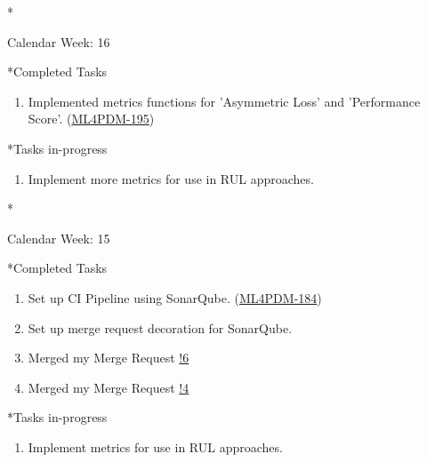 \documentclass[11pt,a4paper]{article}
\begin{document}
\newpage
\begin{section}*{Calendar Week: 16 \hfill \date{23 April, 2021}}
 \begin{refsection}
   \begin{subsection}*{Completed Tasks}
     \begin{enumerate}
       \item
             Implemented metrics functions for 'Asymmetric Loss' and 'Performance Score'. (\href{https://ml4pdm.atlassian.net/browse/ML4PDM-195}{ML4PDM-195})
     \end{enumerate}
   \end{subsection}
   \begin{subsection}*{Tasks in-progress}
     \begin{enumerate}
       \item
             Implement more metrics for use in RUL approaches.
     \end{enumerate}
   \end{subsection}
 \end{refsection}
\end{section}

\newpage
\begin{section}*{Calendar Week: 15 \hfill \date{16 April, 2021}}
 \begin{refsection}
   \begin{subsection}*{Completed Tasks}
     \begin{enumerate}
       \item
             Set up CI Pipeline using SonarQube. (\href{https://ml4pdm.atlassian.net/browse/ML4PDM-184}{ML4PDM-184})
       \item
             Set up merge request decoration for SonarQube.
       \item
             Merged my Merge Request \href{https://git.cs.uni-paderborn.de/machine-learning-for-predictive-maintenance/code/-/merge_requests/6}{!6}
       \item
             Merged my Merge Request \href{https://git.cs.uni-paderborn.de/machine-learning-for-predictive-maintenance/code/-/merge_requests/4}{!4}
     \end{enumerate}
   \end{subsection}
   \begin{subsection}*{Tasks in-progress}
     \begin{enumerate}
       \item
             Implement metrics for use in RUL approaches.
     \end{enumerate}
   \end{subsection}
 \end{refsection}
\end{section}
\end{document}
